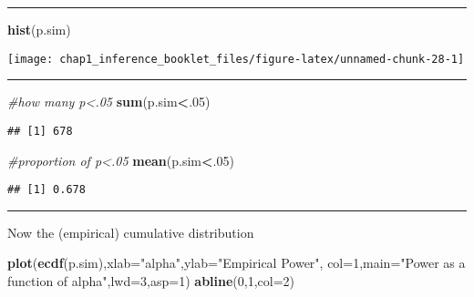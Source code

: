 \documentclass[]{article}
\newenvironment{Shaded}{\begin{snugshade}}{\end{snugshade}}
\newcommand{\KeywordTok}[1]{\textcolor[rgb]{0.13,0.29,0.53}{\textbf{#1}}}
\newcommand{\DataTypeTok}[1]{\textcolor[rgb]{0.13,0.29,0.53}{#1}}
\newcommand{\DecValTok}[1]{\textcolor[rgb]{0.00,0.00,0.81}{#1}}
\newcommand{\StringTok}[1]{\textcolor[rgb]{0.31,0.60,0.02}{#1}}
\newcommand{\CommentTok}[1]{\textcolor[rgb]{0.56,0.35,0.01}{\textit{#1}}}
\newcommand{\OperatorTok}[1]{\textcolor[rgb]{0.81,0.36,0.00}{\textbf{#1}}}
\newcommand{\NormalTok}[1]{#1}
\begin{document}
\begin{center}\rule{0.5\linewidth}{\linethickness}\end{center}

\begin{Shaded}
\begin{Highlighting}[]
\KeywordTok{hist}\NormalTok{(p.sim)}
\end{Highlighting}
\end{Shaded}

\begin{center}\texttt{[image: chap1\_inference\_booklet\_files/figure-latex/unnamed-chunk-28-1]} \end{center}

\begin{center}\rule{0.5\linewidth}{\linethickness}\end{center}

\begin{Shaded}
\begin{Highlighting}[]
\CommentTok{#how many p<.05}
\KeywordTok{sum}\NormalTok{(p.sim}\OperatorTok{<}\NormalTok{.}\DecValTok{05}\NormalTok{)}
\end{Highlighting}
\end{Shaded}

\begin{verbatim}
## [1] 678
\end{verbatim}

\begin{Shaded}
\begin{Highlighting}[]
\CommentTok{#proportion of p<.05}
\KeywordTok{mean}\NormalTok{(p.sim}\OperatorTok{<}\NormalTok{.}\DecValTok{05}\NormalTok{)}
\end{Highlighting}
\end{Shaded}

\begin{verbatim}
## [1] 0.678
\end{verbatim}

\begin{center}\rule{0.5\linewidth}{\linethickness}\end{center}

Now the (empirical) cumulative distribution

\begin{Shaded}
\begin{Highlighting}[]
\KeywordTok{plot}\NormalTok{(}\KeywordTok{ecdf}\NormalTok{(p.sim),}\DataTypeTok{xlab=}\StringTok{"alpha"}\NormalTok{,}\DataTypeTok{ylab=}\StringTok{"Empirical Power"}\NormalTok{, }\DataTypeTok{col=}\DecValTok{1}\NormalTok{,}\DataTypeTok{main=}\StringTok{"Power as a function of alpha"}\NormalTok{,}\DataTypeTok{lwd=}\DecValTok{3}\NormalTok{,}\DataTypeTok{asp=}\DecValTok{1}\NormalTok{)}
\KeywordTok{abline}\NormalTok{(}\DecValTok{0}\NormalTok{,}\DecValTok{1}\NormalTok{,}\DataTypeTok{col=}\DecValTok{2}\NormalTok{)}
\end{Highlighting}
\end{Shaded}
\end{document}
